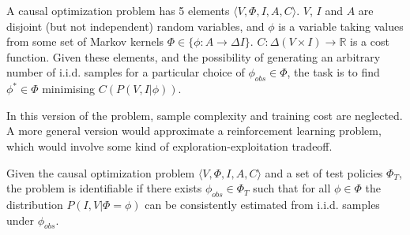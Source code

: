 




\begin{definition}\label{def:2s_copt_prob}
A causal optimization problem has 5 elements $\langle V, \Phi, I, A, C\rangle$. $V$, $I$ and $A$ are disjoint (but not independent) random variables, and $\phi$ is a variable taking values from some set of Markov kernels $\Phi\in\{\phi:A\to  \Delta I\}$. $C:\Delta(V\times I) \to \mathbb{R}$ is a cost function. Given these elements, and the possibility of generating an arbitrary number of i.i.d. samples for a particular choice of $\phi_{obs}\in\Phi$, the task is to find $\phi^*\in \Phi$ minimising $C(P(V, I|\phi))$.
\end{definition}

\begin{remark}
In this version of the problem, sample complexity and training cost are neglected. A more general version would approximate a reinforcement learning problem, which would involve some kind of exploration-exploitation tradeoff.
\end{remark}

\begin{definition}\label{def:causal_ident}
Given the causal optimization problem $\langle V, \Phi, I, A, C\rangle$ and a set of test policies $\Phi_T$, the problem is identifiable if there exists $\phi_{obs}\in\Phi_T$ such that for all $\phi\in\Phi$ the distribution $P(I,V|\Phi=\phi)$ can be consistently estimated from i.i.d. samples under $\phi_{obs}$.
\end{definition}

